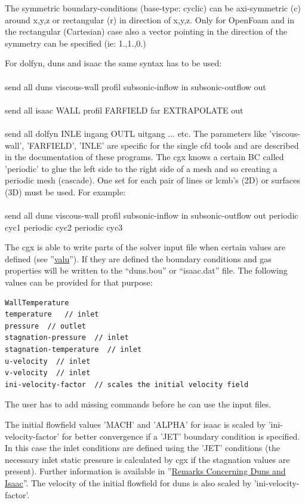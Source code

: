 \documentclass{article}
\providecommand{\htmlref}[2]{\hyperref[#2]{#1}}
\begin{document}
The symmetric boundary-conditions (base-type: cyclic) can be axi-symmetric (c) around x,y,z or rectangular (r) in direction of x,y,z. Only for OpenFoam and in the rectangular (Cartesian) case also a vector pointing in the direction of the symmetry can be specified (ie: 1.,1.,0.)

For dolfyn, duns and isaac the same syntax has to be used:\\\\send all duns viscous-wall profil subsonic-inflow in subsonic-outflow out\\\\send all isaac WALL profil FARFIELD far EXTRAPOLATE out\\\\send all dolfyn INLE ingang OUTL uitgang ... etc. The parameters like 'viscous-wall', 'FARFIELD', 'INLE' are specific for the single cfd tools and are described in the documentation of these programs. The cgx knows a certain BC called 'periodic' to glue the left side to the right side of a mesh and so creating a periodic mesh (cascade). One set for each pair of lines or lcmb's (2D) or surfaces (3D) must be used. For example:\\\\send all duns viscous-wall profil subsonic-inflow in subsonic-outflow out periodic cyc1 periodic cyc2 periodic cyc3

The cgx is able to write parts of the solver input file when certain values are defined (see ''\htmlref{valu}{valu}''). If they are defined the boundary conditions and gas properties will be written to the ``duns.bou'' or ``isaac.dat'' file. The following values can be provided for that purpose:
\begin{verbatim}
WallTemperature
temperature   // inlet
pressure  // outlet
stagnation-pressure  // inlet
stagnation-temperature  // inlet
u-velocity  // inlet
v-velocity  // inlet
ini-velocity-factor  // scales the initial velocity field 
\end{verbatim}
The user has to add missing commands before he can use the input files.

The initial flowfield values 'MACH' and 'ALPHA' for isaac is scaled by 'ini-velocity-factor' for better convergence if a 'JET' boundary condition is specified. In this case the inlet conditions are defined using the 'JET' conditions (the necessary inlet static pressure is calculated by cgx if the stagnation values are present). Further information is available in ''\htmlref{Remarks Concerning Duns and Isaac}{Remarks Concerning Duns and Isaac}''. The velocity of the initial flowfield for duns is also scaled by 'ini-velocity-factor'.
\end{document}
